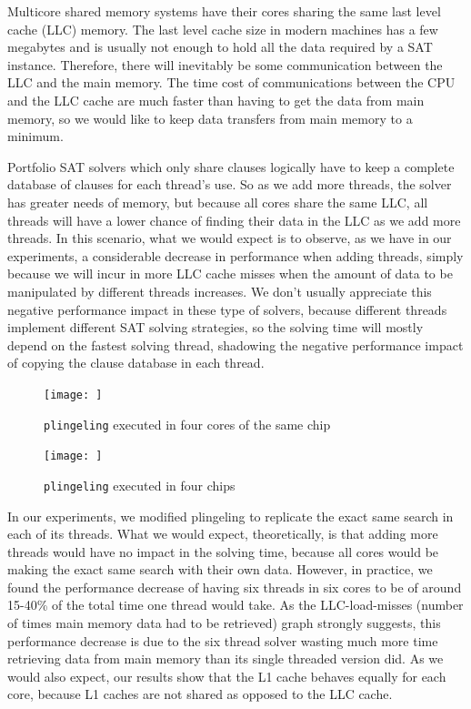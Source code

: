 \documentclass{llncs}
\begin{document}
Multicore shared memory systems have their cores sharing the same last
level cache (LLC) memory. The last level cache size in modern machines
has a few megabytes and is usually not enough to hold all the data
required by a SAT instance. Therefore, there will inevitably be some
communication between the LLC and the main memory. The time cost of
communications between the CPU and the LLC cache are much faster than
having to get the data from main memory, so we would like to keep data
transfers from main memory to a minimum.

Portfolio SAT solvers which only share clauses logically have to keep
a complete database of clauses for each thread's use. So as we add
more threads, the solver has greater needs of memory, but because all
cores share the same LLC, all threads will have a lower chance of
finding their data in the LLC as we add more threads. In this
scenario, what we would expect is to observe, as we have in our
experiments, a considerable decrease in performance when adding
threads, simply because we will incur in more LLC cache misses when
the amount of data to be manipulated by different threads
increases. We don't usually appreciate this negative performance
impact in these type of solvers, because different threads implement
different SAT solving strategies, so the solving time will mostly
depend on the fastest solving thread, shadowing the negative
performance impact of copying the clause database in each thread.

\begin{minipage}[h]{.5\linewidth}
\begin{figure}[tp]
  \centering
  \texttt{[image: ]}
  \caption{{\tt plingeling} executed in four cores of the same chip}
  \label{fig:}
\end{figure}
\begin{figure}[tp]
  \centering
  \texttt{[image: ]}
  \caption{{\tt plingeling} executed in four chips}
  \label{fig:}
\end{figure}
\end{minipage}

In our experiments, we modified plingeling to replicate the exact same
search in each of its threads. What we would expect, theoretically, is
that adding more threads would have no impact in the solving time,
because all cores would be making the exact same search with their own
data. However, in practice, we found the performance decrease of
having six threads in six cores to be of around 15-40\% of the total
time one thread would take. As the LLC-load-misses (number of times
main memory data had to be retrieved) graph strongly suggests, this
performance decrease is due to the six thread solver wasting much more
time retrieving data from main memory than its single threaded version
did. As we would also expect, our results show that the L1 cache
behaves equally for each core, because L1 caches are not shared as
opposed to the LLC cache.
\end{document}
